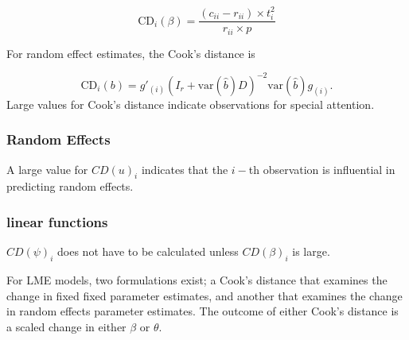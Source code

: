 \documentclass[12pt, a4paper]{article}
\begin{document}
\[
\mbox{CD}_{i}(\beta) = \frac{(c_{ii} - r_{ii}) \times t^2_{i}}{r_{ii} \times p}
\]

For random effect estimates, the  Cook's distance is

\[
\mbox{CD}_{i}(b) = g{\prime}_{(i)} (I_{r} + \mbox{var}(\hat{b})D)^{-2}\mbox{var}(\hat{b})g_{(i)}.
\]
Large values for Cook's distance indicate observations for special attention.










\subsubsection{Random Effects}

A large value for $CD(u)_i$ indicates that the $i-$th observation is influential in predicting random effects.

\subsubsection{linear functions}

$CD(\psi)_i$ does not have to be calculated unless $CD(\beta)_i$ is large.

%

For LME models, two formulations exist; a Cook's distance that examines the change in fixed fixed parameter estimates, and another that examines the change in random effects parameter estimates. The outcome of either Cook's distance is a scaled change in either $\beta$ or $\theta$.


%
%
%
%
%
%
\end{document}
